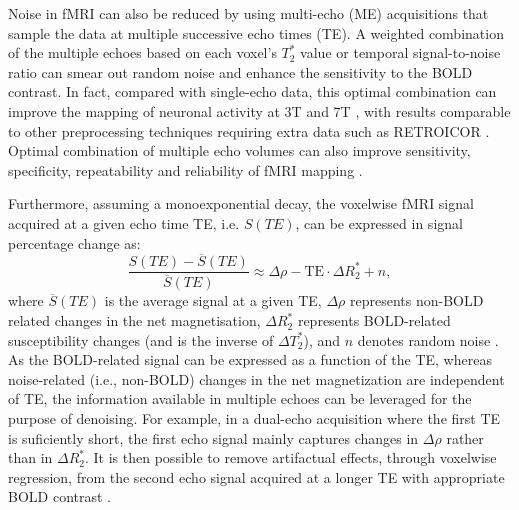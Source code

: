 Noise in fMRI can also be reduced by using multi-echo (ME) acquisitions that
sample the data at multiple successive echo times (TE). A weighted
combination of the multiple echoes based on each voxel's $T_2^*$ value
\citep{Posse1999EnhancementBOLDcontrast} or temporal signal-to-noise ratio
\citep{Poser2006BOLDcontrastsensitivity} can smear out random noise and enhance
the sensitivity to the BOLD contrast. In fact, compared with single-echo data,
this optimal combination \citep{Liu2022geometricviewsignal} can improve the
mapping of neuronal activity at 3T \citep{Fernandez2017MultiechoEPI} and 7T
\citep{Puckett2018Usingmultiecho}, with results comparable to other
preprocessing techniques requiring extra data such as RETROICOR
\citep{Atwi2018AttentionRelatedBrain}. Optimal combination of multiple echo
volumes can also improve sensitivity, specificity, repeatability and reliability
of fMRI mapping
\citep{Cohen2021ImprovingBreathHolding,Cohen2019ImprovingAssessmentBreath}.

Furthermore, assuming a monoexponential decay, the voxelwise fMRI signal
acquired at a given echo time TE, i.e. $S(TE)$, can be expressed in signal
percentage change as:
\begin{equation}
    \frac{S(TE)-\overline{S}(TE)}{\overline{S}(TE)}\approx \Delta \rho - \text{TE} \cdot \Delta R_2^* + n,
\end{equation}
where $\overline{S}(TE)$ is the average signal at a given TE, $\Delta \rho$
represents non-BOLD related changes in the net magnetisation, $\Delta R_2^*$
represents BOLD-related susceptibility changes (and is the inverse of $\Delta
T_2^*$), and $n$ denotes random noise
\citep{Kundu2013Integratedstrategyimproving,Kundu2012DifferentiatingBOLDnon}. As
the BOLD-related signal can be expressed as a function of the TE, whereas
noise-related (i.e., non-BOLD) changes in the net magnetization are independent
of TE, the information available in multiple echoes can be leveraged for the
purpose of denoising. For example, in a dual-echo acquisition where the first TE
is suficiently short, the first echo signal mainly captures changes in $\Delta
\rho$ rather than in $\Delta R_2^*$. It is then possible to remove artifactual
effects, through voxelwise regression, from the second echo signal acquired at a
longer TE with appropriate BOLD contrast
\citep{Bright2013Removingmotionphysiological}.

